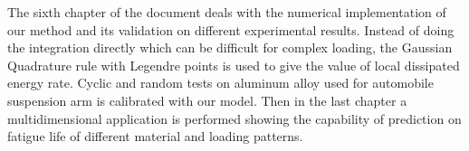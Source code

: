 
The sixth chapter of the document deals with the numerical implementation of our method and its validation on different experimental results. Instead of doing the integration directly which can be difficult for complex loading, the Gaussian
Quadrature rule with Legendre points is used to give the value of local dissipated energy rate. Cyclic and random tests on aluminum alloy used for automobile suspension arm is calibrated with our model. Then in the last chapter a multidimensional  application is performed showing the capability of prediction on fatigue life of different material and loading patterns.
